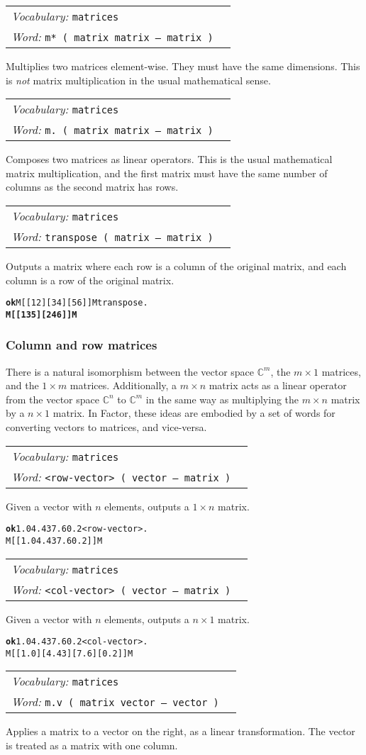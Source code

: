 \documentclass{book}
\newcommand{\tto}{\symbol{123}}
\newcommand{\ttc}{\symbol{125}}
\newcommand{\vocabulary}[1]{\emph{Vocabulary:} \texttt{#1}&\\}
\newcommand{\ordinaryword}[2]{\index{\texttt{#1}}\emph{Word:} \texttt{#2}&\\}
\newcommand{\wordtable}[1]{


\begin{tabularx}{12cm}{lX}
\hline
#1
\hline
\end{tabularx}

}
\begin{document}
\wordtable{
\vocabulary{matrices}
\ordinaryword{m*}{m*~( matrix matrix -- matrix )}
}
Multiplies two matrices element-wise. They must have the same dimensions. This is \emph{not} matrix multiplication in the usual mathematical sense.

\wordtable{
\vocabulary{matrices}
\ordinaryword{m.}{m.~( matrix matrix -- matrix )}
}
Composes two matrices as linear operators. This is the usual mathematical matrix multiplication, and the first matrix must have the same number of columns as the second matrix has rows.

\wordtable{
\vocabulary{matrices}
\ordinaryword{transpose}{transpose~( matrix -- matrix )}
}
Outputs a matrix where each row is a column of the original matrix, and each column is a row of the original matrix.
\begin{alltt}
\textbf{ok} M[ [ 1 2 ] [ 3 4 ] [ 5 6 ] ]M transpose .
\textbf{M[ [ 1 3 5 ] [ 2 4 6 ] ]M}
\end{alltt}

\subsubsection{Column and row matrices}

There is a natural isomorphism between the vector space $\mathbb{C}^m$, the $m\times 1$ matrices, and the $1 \times m$ matrices. Additionally, a $m\times n$ matrix acts as a linear operator from the vector space $\mathbb{C}^n$ to $\mathbb{C}^m$ in the same way as multiplying the $m\times n$ matrix by a $n \times 1$ matrix. In Factor, these ideas are embodied by a set of words for converting vectors to matrices, and vice-versa.

\wordtable{
\vocabulary{matrices}
\ordinaryword{<row-vector>}{<row-vector>~( vector -- matrix )}
}
Given a vector with $n$ elements, outputs a $1 \times n$ matrix.
\begin{alltt}
\textbf{ok} \tto 1.0 4.43 7.6 0.2 \ttc <row-vector> .
M[ [ 1.0 4.43 7.6 0.2 ] ]M
\end{alltt}

\wordtable{
\vocabulary{matrices}
\ordinaryword{<col-vector>}{<col-vector>~( vector -- matrix )}
}
Given a vector with $n$ elements, outputs a $n \times 1$ matrix.
\begin{alltt}
\textbf{ok} \tto 1.0 4.43 7.6 0.2 \ttc <col-vector> .
M[ [ 1.0 ] [ 4.43 ] [ 7.6 ] [ 0.2 ] ]M
\end{alltt}

\wordtable{
\vocabulary{matrices}
\ordinaryword{m.v}{m.v~( matrix vector -- vector )}
}
Applies a matrix to a vector on the right, as a linear transformation. The vector is
treated as a matrix with one column.
\end{document}
